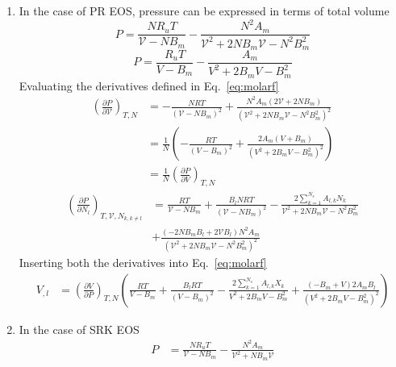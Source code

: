\documentclass[11pt]{article}
\begin{document}
     \begin{enumerate}
     \item In the case of PR EOS, pressure can be expressed in terms of total volume
     \begin{equation}
     P = \frac{N R_u T}{\mathcal{V} - N B_{m}} - \frac{N^{2}A_{m}}{\mathcal{V}^{2}+2NB_{m}\mathcal{V}-N^{2}B_{m}^2}
     \end{equation}
     \begin{equation}
     P = \frac{R_u T}{V - B_{m}} - \frac{A_m}{V^{2}+2B_{m}V - B_{m}^2}
     \end{equation}
      Evaluating the derivatives defined in Eq.~\ref{eq:molarf}
     \begin{align}
     \left(\frac{\partial P}{\partial \mathcal{V}}\right)_{T,N} &= -\frac{N R T}{\left(\mathcal{V}-NB_{m}\right)^{2}} + \frac{N^2 A_m \left(2\mathcal{V}+2N B_m\right)}{\left(\mathcal{V}^{2}+2NB_m\mathcal{V} - N^2B_m^2\right)^2} \\
&=\frac{1}{N} \left(-\frac{R T}{\left(V-B_{m}\right)^{2}} + \frac{2A_m \left(V+B_m\right)}{\left(V^{2}+2B_m V-B_m^2\right)^2}\right) \\
& = \frac{1}{N}\left(\frac{\partial P}{\partial V}\right)_{T,N}
     \end{align}
     \begin{align}
     \left(\frac{\partial P}{\partial N_{l}} \right)_{T,\mathcal{V},N_{k,k\neq l}} &= \frac{R T}{\mathcal{V}- N B_{m}} + \frac{B_l N R T}{\left(\mathcal{V}-N B_m\right)^2} - \frac{2 \sum_{k=1}^{N_{s}} A_{l,k} N_{k}}{\mathcal{V}^2+ 2 N B_{m} \mathcal{V} - N^2 B_m^2}  \nonumber \\
 &+ \frac{\left(-2N B_m B_l + 2\mathcal{V} B_l\right)N^2 A_m}{\left(\mathcal{V}^2+ 2 N B_{m} \mathcal{V} - N^2 B_m^2 \right)^2}
     \end{align}
    Inserting both the derivatives into Eq.~\ref{eq:molarf}
    \begin{align}
    V_{,l} &= \left(\frac{\partial V}{\partial P}\right)_{T,N} \left(\frac{R T}{V- B_{m}} + \frac{B_l R T}{\left(V-B_m\right)^2} - \frac{2 \sum_{k=1}^{N_{s}} A_{l,k} X_{k}}{V^2+ 2 B_{m} V - B_m^2} + \frac{\left(-B_m + V\right) 2 A_m B_l}{\left(V^2+ 2 B_{m} V - B_m^2 \right)^2} \right)
    \end{align}
    \item In the case of SRK EOS
    \begin{align}
    	P & = \frac{N R_u T}{\mathcal{V}-N B_m} - \frac{N^2 A_m}{\mathcal{V}^2+N B_m \mathcal{V}} \nonumber \\

\end{align}
\end{enumerate}
\end{document}
